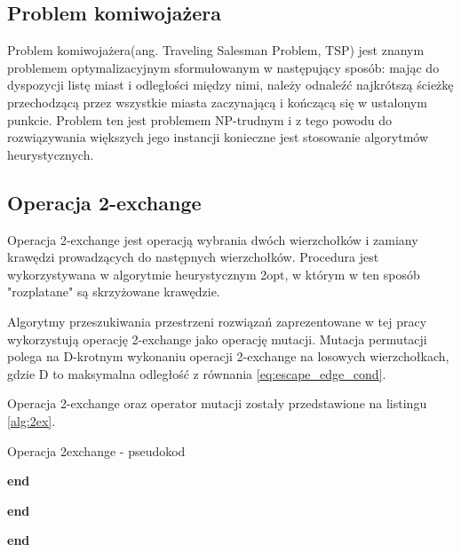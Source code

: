 \subsection{Problem komiwojażera}
Problem komiwojażera(ang. Traveling Salesman Problem, TSP) jest znanym problemem optymalizacyjnym
sformułowanym w następujący sposób: mając do dyspozycji listę miast i odległości między nimi, należy odnaleźć
najkrótszą ścieżkę przechodzącą przez wszystkie miasta zaczynającą i kończącą się w ustalonym punkcie.
Problem ten jest problemem NP-trudnym i z tego powodu do rozwiązywania większych jego instancji konieczne
jest stosowanie algorytmów heurystycznych.
\subsection{Operacja 2-exchange}
Operacja 2-exchange jest operacją wybrania dwóch wierzchołków i zamiany krawędzi prowadzących do następnych wierzchołków.
Procedura jest wykorzystywana w algorytmie heurystycznym 2opt, w którym w ten sposób "rozplatane" są skrzyżowane krawędzie.

Algorytmy przeszukiwania przestrzeni rozwiązań zaprezentowane w tej pracy wykorzystują operację 2-exchange jako operację mutacji.
Mutacja permutacji polega na D-krotnym wykonaniu operacji 2-exchange na losowych wierzchołkach, gdzie D to maksymalna odległość
z równania \ref{eq:escape_edge_cond}.

Operacja 2-exchange oraz operator mutacji zostały przedstawione na listingu \ref{alg:2ex}.

\begin{algorithm}[h!]
      \caption{Operacja 2exchange - pseudokod}\label{alg:2ex}


      \textbf{end}

      \vspace{0.5em}


      \textbf{end}

      \vspace{0.5em}

      \textbf{end}

\end{algorithm}

